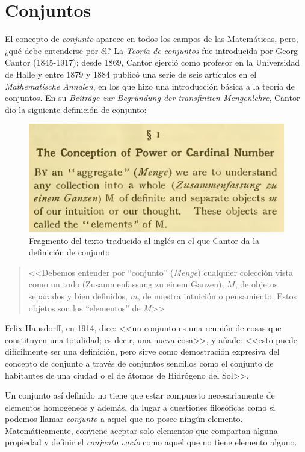 \chapter{Conjuntos}

El concepto de \textit{conjunto} aparece en todos los campos de las
Matemáticas, pero, ¿qué debe entenderse por él? La \textit{Teoría de conjuntos}
fue introducida por Georg Cantor (1845-1917); desde 1869, Cantor ejerció como
profesor en la Universidad de Halle y entre 1879 y 1884 publicó una serie de
seis artículos en el \textit{Mathematische Annalen}, en los que hizo una
introducción básica a la teoría de conjuntos. En su \textit{Beiträge zur
Begründung der transfiniten Mengenlehre}, Cantor dio la siguiente definición
de conjunto:

\begin{figure}[h]
  \centering
  \includegraphics[scale=.2]{fig/definicionConjunto}
  \captionsetup{font=footnotesize}
  \caption{Fragmento del texto traducido al inglés en el que Cantor da la
    definición de conjunto}
\end{figure}

\begin{quote}
  <<Debemos entender por ``conjunto'' (\textit{Menge}) cualquier colección
  vista como un todo (Zusammenfassung zu einem Ganzen), $M$, de objetos
  separados y bien definidos, $m$, de nuestra intuición o pensamiento. Estos
  objetos son los ``elementos'' de $M$>>
\end{quote}

Felix Hausdorff, en 1914, dice: <<un conjunto es una reunión de cosas que
constituyen una totalidad; es decir, una nueva cosa>>, y añade: <<esto puede
difícilmente ser una definición, pero sirve como demostración expresiva del
concepto de conjunto a través de conjuntos sencillos como el conjunto de
habitantes de una ciudad o el de átomos de Hidrógeno del Sol>>.

Un conjunto así definido no tiene que estar compuesto necesariamente de
elementos homogéneos y además, da lugar a cuestiones filosóficas como si
podemos llamar \textit{conjunto} a aquel que no posee ningún elemento.
Matemáticamente, conviene aceptar solo elementos que compartan alguna propiedad
y definir el \textit{conjunto vacío} como aquel que no tiene elemento alguno.

